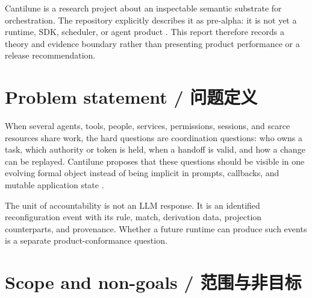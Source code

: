 \label{ch:context}

Cantilune is a research project about an inspectable semantic substrate for orchestration. The
repository explicitly describes it as pre-alpha: it is not yet a runtime, SDK, scheduler, or
agent product \citep{cantiluneReadme}. This report therefore records a theory and evidence
boundary rather than presenting product performance or a release recommendation.

\section{Problem statement / 问题定义}

When several agents, tools, people, services, permissions, sessions, and scarce resources share
work, the hard questions are coordination questions: who owns a task, which authority or token is
held, when a handoff is valid, and how a change can be replayed. Cantilune proposes that these
questions should be visible in one evolving formal object instead of being implicit in prompts,
callbacks, and mutable application state \citep{cantiluneReadme,cantiluneRFCOne}.

\begin{MWInsight}
The unit of accountability is not an LLM response. It is an identified reconfiguration event with
its rule, match, derivation data, projection counterparts, and provenance. Whether a future
runtime can produce such events is a separate product-conformance question.
\end{MWInsight}

\section{Scope and non-goals / 范围与非目标}

